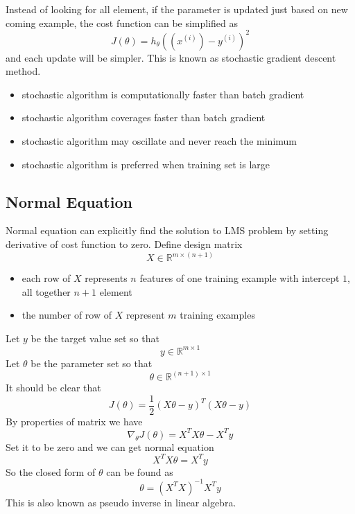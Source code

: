 \documentclass[10pt,a4paper,oneside]{article}
\begin{document}
Instead of looking for all element, if the parameter is updated just based on new coming example, the cost function can be simplified as
\[
J(\theta) = h_\theta((x^{(i)}) - y^{(i)})^2
\]
and each update will be simpler. This is known as stochastic gradient descent method.
\begin{itemize}
	\item stochastic algorithm is computationally faster than batch gradient
	\item stochastic algorithm coverages faster than batch gradient
	\item stochastic algorithm may oscillate and never reach the minimum
	\item stochastic algorithm is preferred when training set is large 
\end{itemize}

\subsection{Normal Equation}
Normal equation can explicitly find the solution to LMS problem by setting derivative of cost function to zero. Define design matrix 
\[
X \in \mathbb{R}^{m \times (n+1)}
\]
\begin{itemize}
	\item each row of $X$ represents $n$ features of one training example with intercept $1$, all together $n+1$ element
	\item the number of row of $X$ represent $m$ training examples
\end{itemize}
Let $y$ be the target value set so that 
\[
y \in \mathbb{R}^{m \times 1}
\]
Let $\theta$ be the parameter set so that
\[
\theta \in \mathbb{R}^{(n+1) \times 1}
\]
It should be clear that
\[
J(\theta) = \frac{1}{2}(X\theta-y)^T (X\theta-y)
\]
By properties of matrix we have
\[
\nabla _\theta J(\theta) = X^T X\theta - X^T y
\]
Set it to be zero and we can get normal equation
\[
X^T X\theta = X^T y
\]
So the closed form of $\theta$ can be found as
\[
\theta = (X^T X)^{-1} X^T y
\]
This is also known as pseudo inverse in linear algebra.
\end{document}
